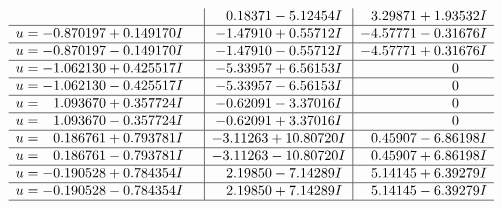 \documentclass[1p]{elsarticle_modified}
\theoremstyle{definition}
\begin{document}
$$\begin{array}{c|c|c}
 & \phantom{-}0.18371 - 5.12454 I & \phantom{-}3.29871 + 1.93532 I \\ \hline\begin{aligned}
u &= -0.870197 + 0.149170 I\end{aligned}
 & -1.47910 + 0.55712 I & -4.57771 - 0.31676 I \\ \hline\begin{aligned}
u &= -0.870197 - 0.149170 I\end{aligned}
 & -1.47910 - 0.55712 I & -4.57771 + 0.31676 I \\ \hline\begin{aligned}
u &= -1.062130 + 0.425517 I\end{aligned}
 & -5.33957 + 6.56153 I & \phantom{-0.000000 } 0 \\ \hline\begin{aligned}
u &= -1.062130 - 0.425517 I\end{aligned}
 & -5.33957 - 6.56153 I & \phantom{-0.000000 } 0 \\ \hline\begin{aligned}
u &= \phantom{-}1.093670 + 0.357724 I\end{aligned}
 & -0.62091 - 3.37016 I & \phantom{-0.000000 } 0 \\ \hline\begin{aligned}
u &= \phantom{-}1.093670 - 0.357724 I\end{aligned}
 & -0.62091 + 3.37016 I & \phantom{-0.000000 } 0 \\ \hline\begin{aligned}
u &= \phantom{-}0.186761 + 0.793781 I\end{aligned}
 & -3.11263 + 10.80720 I & \phantom{-}0.45907 - 6.86198 I \\ \hline\begin{aligned}
u &= \phantom{-}0.186761 - 0.793781 I\end{aligned}
 & -3.11263 - 10.80720 I & \phantom{-}0.45907 + 6.86198 I \\ \hline\begin{aligned}
u &= -0.190528 + 0.784354 I\end{aligned}
 & \phantom{-}2.19850 - 7.14289 I & \phantom{-}5.14145 + 6.39279 I \\ \hline\begin{aligned}
u &= -0.190528 - 0.784354 I\end{aligned}
 & \phantom{-}2.19850 + 7.14289 I & \phantom{-}5.14145 - 6.39279 I\\
 \hline 
 \end{array}$$\newpage$$\begin{array}{c|c|c}  

\end{array}$$
\end{document}
